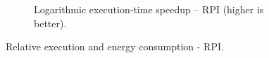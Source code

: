 \begin{figure}[]
\begin{subfigure}[t]{0.48\textwidth}
    \caption{Logarithmic execution‑time speedup – RPI (higher is better).}
    \label{fig:rpi-time-speedup}
  \end{subfigure}

  \caption{Relative execution and energy consumption - RPI.}
  \label{fig:rpi-relative-combined}
\end{figure}
